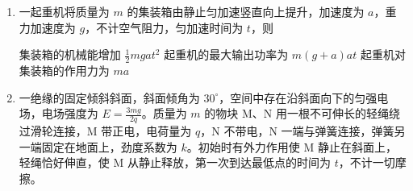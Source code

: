 \documentclass[\gkver]{gaokaozhenti}
\begin{document}
\begin{enumerate}
{	其中 $U_{2} = 10 \UV$，$I_{2} = 4 \UA$

	可得 $I_{1} = \frac{2}{11} \UA$，故 B 错误；

	C．原线圈输入电压不变，匝数比不变，根据 $\frac{U_{1}}{U_{2}} = \frac{n_{1}}{n_{2}}$，副线圈两端的电压不变，即电压表读数不变，C 错误；

	D．滑动变阻器向上滑动，滑动变阻器接入的阻值减小，副线圈电压不变，根据 $I_{2} = \frac{U_{2}}{R}$ 可知电流增大，即电流表读数增大，D 正确。

	故选 AD。
}

\item
一起重机将质量为 $m$ 的集装箱由静止匀加速竖直向上提升，加速度为 $a$，重力加速度为 $g$，不计空气阻力，匀加速时间为 $t$，则

{集装箱的机械能增加 $\frac{1}{2}mgat^{2}$}
{起重机的最大输出功率为 $m(g + a)at$}
{起重机对集装箱的作用力为 $ma$}


\item
一绝缘的固定倾斜斜面，斜面倾角为 $30^\circ$，空间中存在沿斜面向下的匀强电场，电场强度为 $E = \frac{3mg}{2q}$。质量为 $m$ 的物块 M、N 用一根不可伸长的轻绳绕过滑轮连接，M 带正电，电荷量为 $q$，N 不带电，N 一端与弹簧连接，弹簧另一端固定在地面上，劲度系数为 $k$。初始时有外力作用使 M 静止在斜面上，轻绳恰好伸直，使 M 从静止释放，第一次到达最低点的时间为 $t$，不计一切摩擦。


\end{enumerate}
\end{document}
